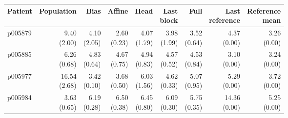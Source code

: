\documentclass[11pt]{article}
\begin{document}
\begin{table}[!htbp]\centering\scriptsize\setlength{\tabcolsep}{3pt}
\begin{tabular}{lrrrrrrrr}\toprule
Patient & Population & Bias & Affine & Head & \shortstack{Last\\block} & Full & \shortstack{Last\\reference} & \shortstack{Reference\\mean}\\\midrule
p005879 & \shortstack{9.40\\(2.00)} & \shortstack{4.10\\(2.05)} & \shortstack{2.60\\(0.23)} & \shortstack{4.07\\(1.79)} & \shortstack{3.98\\(1.99)} & \shortstack{3.52\\(0.64)} & \shortstack{4.37\\(0.00)} & \shortstack{3.26\\(0.00)}\\
p005885 & \shortstack{6.26\\(0.68)} & \shortstack{4.83\\(0.64)} & \shortstack{4.67\\(0.75)} & \shortstack{4.94\\(0.83)} & \shortstack{4.57\\(0.52)} & \shortstack{4.53\\(0.84)} & \shortstack{3.10\\(0.00)} & \shortstack{3.24\\(0.00)}\\
p005977 & \shortstack{16.54\\(2.68)} & \shortstack{3.42\\(0.10)} & \shortstack{3.68\\(0.50)} & \shortstack{6.03\\(1.56)} & \shortstack{4.62\\(0.33)} & \shortstack{5.07\\(0.95)} & \shortstack{5.29\\(0.00)} & \shortstack{3.72\\(0.00)}\\
p005984 & \shortstack{3.63\\(0.65)} & \shortstack{6.19\\(0.28)} & \shortstack{6.50\\(0.38)} & \shortstack{6.45\\(0.80)} & \shortstack{6.09\\(0.30)} & \shortstack{5.75\\(0.35)} & \shortstack{14.36\\(0.00)} & \shortstack{5.25\\(0.00)}\\

\end{tabular}
\end{table}
\end{document}
